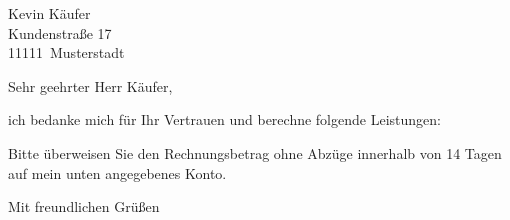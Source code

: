 \documentclass[version=last,fontsize=12pt,footheight=30mm,DIV=15]{scrlttr2}
\newcommand{\BuyerName}{Kevin Käufer}
\newcommand{\BuyerPostcode}{11111}
\newcommand{\BuyerCity}{Musterstadt}
\newcommand{\BuyerAddress}{Kundenstraße 17}
\begin{document}
  \begin{letter}{\BuyerName\\
      \BuyerAddress\\
      \BuyerPostcode\ \BuyerCity
    }
    \enlargethispage{6\baselineskip} %
    \opening{Sehr geehrter Herr Käufer,}

    ich bedanke mich für Ihr Vertrauen und berechne folgende Leistungen:


    \PrintInvoiceTabular

    \noindent Bitte überweisen Sie den Rechnungsbetrag ohne Abzüge innerhalb
    von 14 Tagen auf mein unten angegebenes Konto.
    \closing{Mit freundlichen Grüßen}
  \end{letter}
\end{document}
